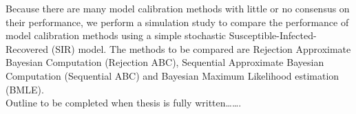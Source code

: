  
 
Because there are many model calibration methods with little or no consensus on their performance, we perform a simulation study to compare the performance of model calibration methods using a simple stochastic Susceptible-Infected-Recovered (SIR) model. The methods to be compared are Rejection Approximate Bayesian Computation (Rejection ABC), Sequential Approximate Bayesian Computation (Sequential ABC) and Bayesian Maximum Likelihood estimation (BMLE).\\

Outline to be completed when thesis is fully written…….

